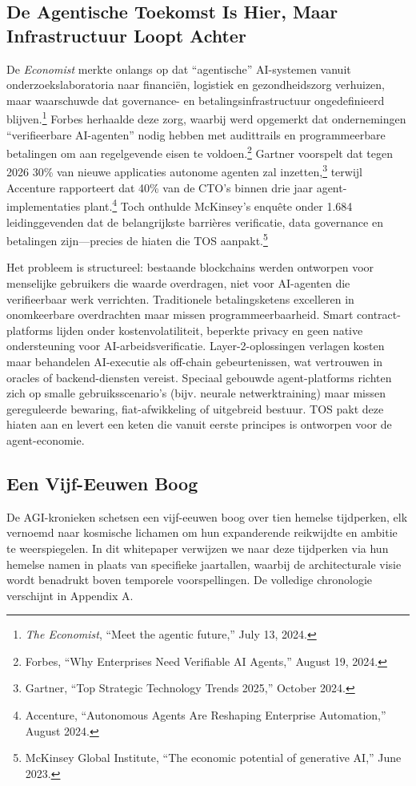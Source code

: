 \documentclass[11pt]{article}
\begin{document}
\subsection{De Agentische Toekomst Is Hier, Maar Infrastructuur Loopt Achter}
De \emph{Economist} merkte onlangs op dat ``agentische'' AI-systemen vanuit onderzoekslaboratoria naar financiën, logistiek en gezondheidszorg verhuizen, maar waarschuwde dat governance- en betalingsinfrastructuur ongedefinieerd blijven.\footnote{\emph{The Economist}, ``Meet the agentic future,'' July 13, 2024.} Forbes herhaalde deze zorg, waarbij werd opgemerkt dat ondernemingen ``verifieerbare AI-agenten'' nodig hebben met audittrails en programmeerbare betalingen om aan regelgevende eisen te voldoen.\footnote{Forbes, ``Why Enterprises Need Verifiable AI Agents,'' August 19, 2024.} Gartner voorspelt dat tegen 2026 30\% van nieuwe applicaties autonome agenten zal inzetten,\footnote{Gartner, ``Top Strategic Technology Trends 2025,'' October 2024.} terwijl Accenture rapporteert dat 40\% van de CTO's binnen drie jaar agent-implementaties plant.\footnote{Accenture, ``Autonomous Agents Are Reshaping Enterprise Automation,'' August 2024.} Toch onthulde McKinsey's enquête onder 1.684 leidinggevenden dat de belangrijkste barrières verificatie, data governance en betalingen zijn---precies de hiaten die TOS aanpakt.\footnote{McKinsey Global Institute, ``The economic potential of generative AI,'' June 2023.}

Het probleem is structureel: bestaande blockchains werden ontworpen voor menselijke gebruikers die waarde overdragen, niet voor AI-agenten die verifieerbaar werk verrichten. Traditionele betalingsketens excelleren in onomkeerbare overdrachten maar missen programmeerbaarheid. Smart contract-platforms lijden onder kostenvolatiliteit, beperkte privacy en geen native ondersteuning voor AI-arbeidsverificatie. Layer-2-oplossingen verlagen kosten maar behandelen AI-executie als off-chain gebeurtenissen, wat vertrouwen in oracles of backend-diensten vereist. Speciaal gebouwde agent-platforms richten zich op smalle gebruiksscenario's (bijv. neurale netwerktraining) maar missen gereguleerde bewaring, fiat-afwikkeling of uitgebreid bestuur. TOS pakt deze hiaten aan en levert een keten die vanuit eerste principes is ontworpen voor de agent-economie.

\subsection{Een Vijf-Eeuwen Boog}
De AGI-kronieken schetsen een vijf-eeuwen boog over tien hemelse tijdperken, elk vernoemd naar kosmische lichamen om hun expanderende reikwijdte en ambitie te weerspiegelen. In dit whitepaper verwijzen we naar deze tijdperken via hun hemelse namen in plaats van specifieke jaartallen, waarbij de architecturale visie wordt benadrukt boven temporele voorspellingen. De volledige chronologie verschijnt in Appendix A.
\end{document}

